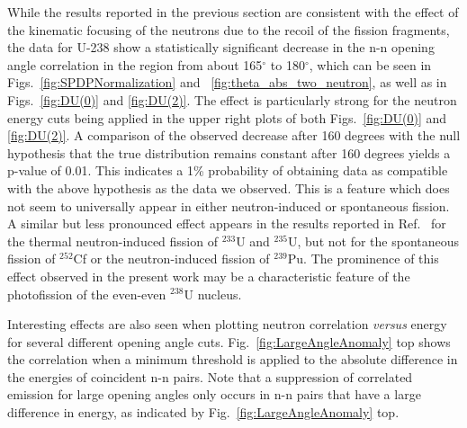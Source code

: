 \label{sec:anomaly}
While the results reported in the previous section are consistent with the effect of the kinematic focusing of the neutrons due to the recoil of the fission fragments, the data for U-238 show a statistically significant decrease in the n-n opening angle correlation in the region from about 165$^{\circ}$ to 180$^{\circ}$, which can be seen in Figs.~\ref{fig:SPDPNormalization} and ~\ref{fig:theta_abs_two_neutron}, as well as in Figs.~\ref{fig:DU(0)} and \ref{fig:DU(2)}.
The effect is particularly strong for the neutron energy cuts being applied in the upper right plots of both Figs.~\ref{fig:DU(0)} and \ref{fig:DU(2)}.
A comparison of the observed decrease after 160 degrees with the null hypothesis that the true distribution remains constant after 160 degrees yields a p-value of 0.01.
This indicates a 1\% probability of obtaining data as compatible with the above hypothesis as the data we observed.
This is a feature which does not seem to universally appear in either neutron-induced or spontaneous fission.
A similar but less pronounced effect appears in the results reported in Ref.~\cite{Sokolov2010} for the thermal neutron-induced fission of $^{233}$U and $^{235}$U, but not for the spontaneous fission of $^{252}$Cf or the neutron-induced fission of $^{239}$Pu.
The prominence of this effect observed in the present work may be a characteristic feature of the photofission of the even-even $^{238}$U nucleus.

Interesting effects are also seen when plotting neutron correlation \textit{versus} energy for several different opening angle cuts.
Fig.~\ref{fig:LargeAngleAnomaly} top shows the correlation when a minimum threshold is applied to the absolute difference in the energies of coincident n-n pairs. %
Note that a suppression of correlated emission for large opening angles only occurs in n-n pairs that have a large difference in energy, as indicated by Fig.~\ref{fig:LargeAngleAnomaly} top.

